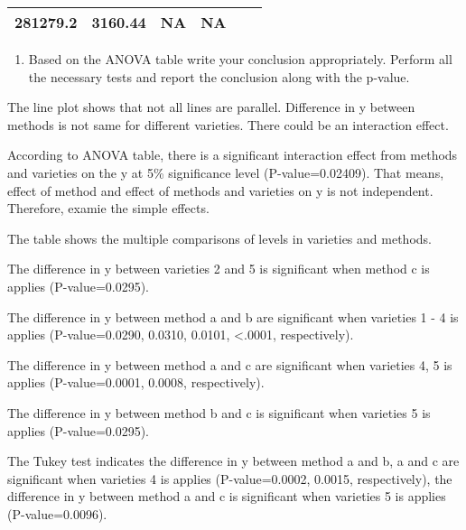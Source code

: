 \documentclass[]{article}
\providecommand{\tightlist}{%
  \setlength{\itemsep}{0pt}\setlength{\parskip}{0pt}}
\begin{document}
\begin{longtable}[]{@{}cllllc@{}}
\begin{minipage}[t]{0.10\columnwidth}
281279.2\strut
\end{minipage} & \begin{minipage}[t]{0.12\columnwidth}\raggedright
3160.44\strut
\end{minipage} & \begin{minipage}[t]{0.12\columnwidth}\raggedright
NA\strut
\end{minipage} & \begin{minipage}[t]{0.14\columnwidth}\centering
NA\strut
\end{minipage}\tabularnewline
\bottomrule
\end{longtable}

\begin{enumerate}
\def\labelenumi{(\alph{enumi})}
\setcounter{enumi}{3}
\tightlist
\item
  \textcolor[rgb]{0.5,0.5,0.5}{Based on the ANOVA table write your conclusion appropriately. Perform all the necessary tests and report the conclusion along with the p-value.}
\end{enumerate}

The line plot shows that not all lines are parallel. Difference in y
between methods is not same for different varieties. There could be an
interaction effect.

According to ANOVA table, there is a significant interaction effect from
methods and varieties on the y at 5\% significance level
(P-value=0.02409). That means, effect of method and effect of methods
and varieties on y is not independent. Therefore, examie the simple
effects.

The table shows the multiple comparisons of levels in varieties and
methods.

The difference in y between varieties 2 and 5 is significant when method
c is applies (P-value=0.0295).

The difference in y between method a and b are significant when
varieties 1 - 4 is applies (P-value=0.0290, 0.0310, 0.0101,
\textless{}.0001, respectively).

The difference in y between method a and c are significant when
varieties 4, 5 is applies (P-value=0.0001, 0.0008, respectively).

The difference in y between method b and c is significant when varieties
5 is applies (P-value=0.0295).

The Tukey test indicates the difference in y between method a and b, a
and c are significant when varieties 4 is applies (P-value=0.0002,
0.0015, respectively), the difference in y between method a and c is
significant when varieties 5 is applies (P-value=0.0096).
\end{document}
